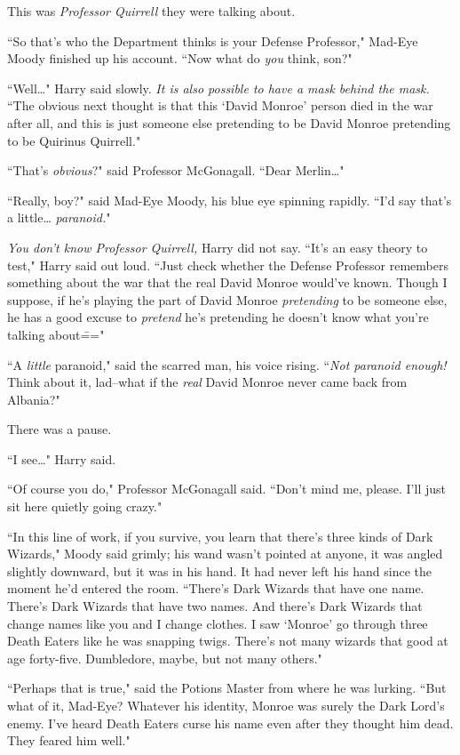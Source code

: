 This was \emph{Professor Quirrell} they were talking about.

``So that's who the Department thinks is your Defense Professor," Mad-Eye Moody finished up his account. ``Now what do \emph{you} think, son?"

``Well{\ldots}" Harry said slowly. \emph{It is also possible to have a mask behind the mask.} ``The obvious next thought is that this `David Monroe' person died in the war after all, and this is just someone else pretending to be David Monroe pretending to be Quirinus Quirrell."

``That's \emph{obvious}?" said Professor McGonagall. ``Dear Merlin{\ldots}"

``Really, boy?" said Mad-Eye Moody, his blue eye spinning rapidly. ``I'd say that's a little{\ldots} \emph{paranoid.}"

\emph{You don't know Professor Quirrell,} Harry did not say. ``It's an easy theory to test," Harry said out loud. ``Just check whether the Defense Professor remembers something about the war that the real David Monroe would've known. Though I suppose, if he's playing the part of David Monroe \emph{pretending} to be someone else, he has a good excuse to \emph{pretend} he's pretending he doesn't know what you're talking about\==="

``A \emph{little} paranoid," said the scarred man, his voice rising. ``\emph{Not paranoid enough! } Think about it, lad\---what if the \emph{real} David Monroe never came back from Albania?"

There was a pause.

``I see{\ldots}" Harry said.

``Of course you do," Professor McGonagall said. ``Don't mind me, please. I'll just sit here quietly going crazy."

``In this line of work, if you survive, you learn that there's three kinds of Dark Wizards," Moody said grimly; his wand wasn't pointed at anyone, it was angled slightly downward, but it was in his hand. It had never left his hand since the moment he'd entered the room. ``There's Dark Wizards that have one name. There's Dark Wizards that have two names. And there's Dark Wizards that change names like you and I change clothes. I saw `Monroe' go through three Death Eaters like he was snapping twigs. There's not many wizards that good at age forty-five. Dumbledore, maybe, but not many others."

``Perhaps that is true," said the Potions Master from where he was lurking. ``But what of it, Mad-Eye? Whatever his identity, Monroe was surely the Dark Lord's enemy. I've heard Death Eaters curse his name even after they thought him dead. They feared him well."

